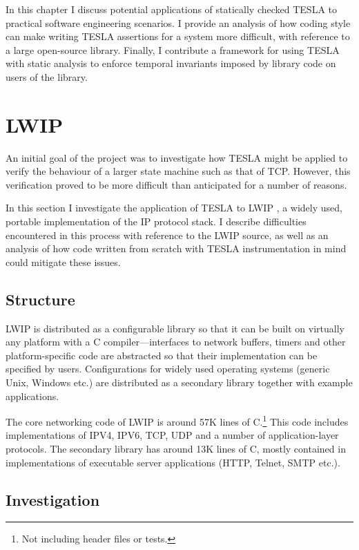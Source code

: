 In this chapter I discuss potential applications of statically checked
TESLA to practical software engineering scenarios. I provide an analysis
of how coding style can make writing TESLA assertions for a system more
difficult, with reference to a large open-source library. Finally, I
contribute a framework for using TESLA with static analysis to enforce
temporal invariants imposed by library code on users of the library.

\section{LWIP} \label{sec:lwip}

An initial goal of the project was to investigate how TESLA might be
applied to verify the behaviour of a larger state machine such as that
of TCP. However, this verification proved to be more difficult than
anticipated for a number of reasons.

In this section I investigate the application of TESLA to LWIP
\cite{dunkels_design_2001}, a widely used, portable implementation of
the IP protocol stack. I describe difficulties encountered in this
process with reference to the LWIP source, as well as an analysis of how
code written from scratch with TESLA instrumentation in mind could
mitigate these issues.

\subsection{Structure}

LWIP is distributed as a configurable library so that it can be built on
virtually any platform with a C compiler---interfaces to network
buffers, timers and other platform-specific code are abstracted so that
their implementation can be specified by users. Configurations for
widely used operating systems (generic Unix, Windows etc.) are
distributed as a secondary library together with example applications.

The core networking code of LWIP is around 57K lines of C.\footnote{Not
including header files or tests.} This code includes implementations of
IPV4, IPV6, TCP, UDP and a number of application-layer protocols. The
secondary library has around 13K lines of C, mostly contained in
implementations of executable server applications (HTTP, Telnet, SMTP
etc.).

\subsection{Investigation}

